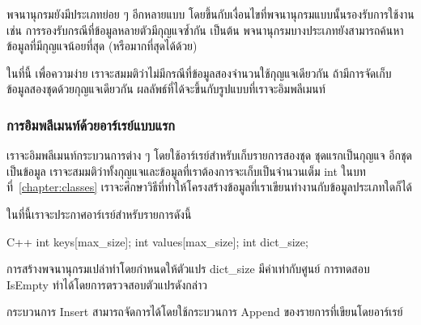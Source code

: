 พจนานุกรม{\wbr}ยัง{\wbr}มี{\wbr}ประเภท{\wbr}ย่อย ๆ อีก{\wbr}หลาย{\wbr}แบบ{\wbr}
โดย{\wbr}ขึ้น{\wbr}กับ{\wbr}เงื่อนไข{\wbr}ที่{\wbr}พจนานุกรม{\wbr}แบบ{\wbr}นั้น{\wbr}รองรับ{\wbr}การ{\wbr}ใช้{\wbr}งาน เช่น{\wbr}
การ{\wbr}รองรับ{\wbr}กรณี{\wbr}ที่{\wbr}ข้อมูล{\wbr}หลาย{\wbr}ตัว{\wbr}มี{\wbr}กุญแจ{\wbr}ซ้ำ{\wbr}กัน เป็นต้น{\wbr}
พจนานุกรม{\wbr}บาง{\wbr}ประเภท{\wbr}ยัง{\wbr}สามารถ{\wbr}ค้นหา{\wbr}ข้อมูล{\wbr}ที่{\wbr}มี{\wbr}กุญแจ{\wbr}น้อย{\wbr}ที่สุด (หรือ{\wbr}มาก{\wbr}ที่สุด{\wbr}ได้{\wbr}ด้วย)

ใน{\wbr}ที่นี้ เพื่อ{\wbr}ความ{\wbr}ง่าย เรา{\wbr}จะ{\wbr}สมมติ{\wbr}ว่า{\wbr}ไม่{\wbr}มี{\wbr}กรณี{\wbr}ที่{\wbr}ข้อมูล{\wbr}สอง{\wbr}จำนวน{\wbr}ใช้{\wbr}กุญแจ{\wbr}เดียวกัน{\wbr}
ถ้า{\wbr}มี{\wbr}การ{\wbr}จัด{\wbr}เก็บ{\wbr}ข้อมูล{\wbr}สอง{\wbr}ชุด{\wbr}ด้วย{\wbr}กุญแจ{\wbr}เดียวกัน ผลลัพธ์{\wbr}ที่{\wbr}ได้{\wbr}จะ{\wbr}ขึ้น{\wbr}กับ{\wbr}รูปแบบ{\wbr}ที่{\wbr}เรา{\wbr}จะ{\wbr}อิม{\wbr}พลี{\wbr}เมนท์

\subsubsection{การ{\wbr}อิม{\wbr}พลี{\wbr}เมนท์{\wbr}ด้วย{\wbr}อาร์เรย์{\wbr}แบบ{\wbr}แรก}

เรา{\wbr}จะ{\wbr}อิม{\wbr}พลี{\wbr}เมนท์{\wbr}กระบวนการ{\wbr}ต่าง ๆ โดย{\wbr}ใช้{\wbr}อาร์เรย์{\wbr}สำหรับ{\wbr}เก็บ{\wbr}รายการ{\wbr}สอง{\wbr}ชุด{\wbr}
ชุด{\wbr}แรก{\wbr}เป็น{\wbr}กุญแจ อีก{\wbr}ชุด{\wbr}เป็น{\wbr}ข้อมูล{\wbr}
เรา{\wbr}จะ{\wbr}สมมติ{\wbr}ว่า{\wbr}ทั้ง{\wbr}กุญแจ{\wbr}และ{\wbr}ข้อมูล{\wbr}ที่{\wbr}เรา{\wbr}ต้องการ{\wbr}จะ{\wbr}เก็บ{\wbr}เป็น{\wbr}จำนวนเต็ม {\ct int}
ใน{\wbr}บท{\wbr}ที่~\ref{chapter:classes}
เรา{\wbr}จะ{\wbr}ศึกษา{\wbr}วิธี{\wbr}ที่{\wbr}ทำ{\wbr}ให้{\wbr}โครงสร้าง{\wbr}ข้อมูล{\wbr}ที่{\wbr}เรา{\wbr}เขียน{\wbr}ทำงาน{\wbr}กับ{\wbr}ข้อมูล{\wbr}ประเภท{\wbr}ใด{\wbr}ก็ได้{\wbr}

ใน{\wbr}ที่นี้{\wbr}เรา{\wbr}จะ{\wbr}ประกาศ{\wbr}อาร์เรย์{\wbr}สำหรับ{\wbr}รายการ{\wbr}ดังนี้{\wbr}
\latintext
\begin{codelist}{C++}{}
int keys[max_size];
int values[max_size];
int dict_size;
\end{codelist}
\thaitext

การ{\wbr}สร้าง{\wbr}พจนานุกรม{\wbr}เปล่า{\wbr}ทำ{\wbr}โดย{\wbr}กำหนด{\wbr}ให้{\wbr}ตัวแปร {\ct dict\_size} มี{\wbr}ค่า{\wbr}เท่า{\wbr}กับ{\wbr}ศูนย์{\wbr}
การ{\wbr}ทดสอบ IsEmpty ทำ{\wbr}ได้{\wbr}โดย{\wbr}การ{\wbr}ตรวจสอบ{\wbr}ตัวแปร{\wbr}ดังกล่าว{\wbr}

กระบวนการ Insert สามารถ{\wbr}จัดการ{\wbr}ได้{\wbr}โดย{\wbr}ใช้{\wbr}กระบวนการ Append ของ{\wbr}รายการ{\wbr}ที่{\wbr}เขียน{\wbr}โดย{\wbr}อาร์เรย์


